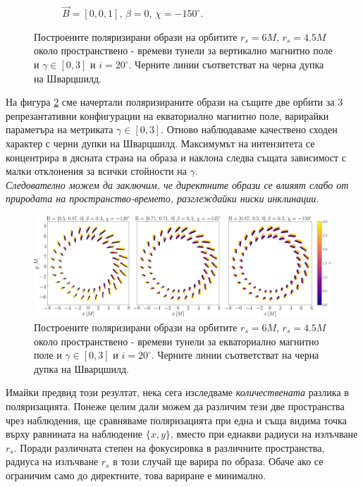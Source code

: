 \begin{figure}[!htb]
\begin{subfigure}{6cm}
		\caption{$\vec{B} = [0, 0, 1]$, $\beta = 0$, $\chi = -150^\circ$.}
	\end{subfigure}
	\caption[Поляризирани образи около пространствено - времеви тунели за вертикално магнитно поле.]{\small Построените поляризирани образи на орбитите $r_s = 6M$, $r_s = 4.5M$ около пространствено - времеви тунели за вертикално магнитно поле и $\gamma \in[0,3]$ и $i = 20^\circ$. Черните линии съответстват на черна дупка на Шварцшилд.} 
	\label{WH_pol_vert_field}
\end{figure}

На фигура \ref{WH_pol_eq_field} сме начертали поляризираните образи на същите две орбити за 3 репрезантативни конфигурации на екваториално магнитно поле, варирайки параметъра на метриката $\gamma \in[0,3]$. Отново наблюдаваме качествено сходен характер с черни дупки на Шварцшилд. Максимумът на интензитета се концентрира в дясната страна на образа и наклона следва същата зависимост с малки отклонения за всички стойности на $\gamma$. \\

\emph{Следователно можем да заключим, че директните образи се влияят слабо от природата на пространство-времето, разглеждайки ниски инклинации.}

\begin{figure}[!htb]
	\hspace{-0.7cm}
	\includegraphics[scale = 0.2]{WH_alpha_Eq_Field.png}
	\caption[Поляризирани образи около пространствено - времеви тунели за екваториално магнитно поле.]{\small Построените поляризирани образи на орбитите $r_s = 6M$, $r_s = 4.5M$ около пространствено - времеви тунели за екваториално магнитно поле и $\gamma \in[0,3]$ и $i = 20^\circ$. Черните линии съответстват на черна дупка на Шварцшилд.} 
	\label{WH_pol_eq_field}
\end{figure}

\newpage

Имайки предвид този резултат, нека сега изследваме \emph{количествената} разлика в поляризацията. Понеже целим дали можем да различим тези две пространства чрез наблюдения, ще сравняваме поляризацията при една и съща видима точка върху равнината на наблюдение $\{x,y\}$, вместо при еднакви радиуси на излъчване $r_s$. Поради различната степен на фокусировка в различните пространства, радиуса на излъчване $r_s$ в този случай ще варира по образа. Обаче ако се ограничим само до директните, това вариране е минимално.\\

